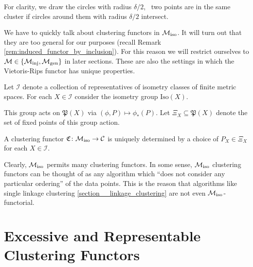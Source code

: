 \begin{example}{}{}
\begin{center}
\begin{minipage}{\textwidth}
\label{fig:vietoris_rips_example}
\end{minipage}
\end{center}
For clarity, we draw the circles with radius $\delta / 2$, \ie\ two points are in the same cluster if circles around them with radius $\delta / 2$ intersect.
\end{example}

We have to quickly talk about clustering functors in ${\mathcal{M}_\mathrm{iso}}$.
It will turn out that they are too general for our purposes (recall Remark \ref{rem:induced_functor_by_inclusion}).
For this reason we will restrict ourselves to $\mathcal{M} \in \{{\mathcal{M}_\mathrm{inj}}, {\mathcal{M}_\mathrm{gen}}\}$ in later sections. These are also the settings in which the Vietoris-Rips functor has unique properties.

\begin{myremark}{\cite[Thm.~6.1]{Carlsson2010}}{}
Let $\mathcal{I}$ denote a collection of representatives of isometry classes of finite metric spaces.
For each $X \in \mathcal{I}$ consider the isometry group $\mathrm{Iso}(X)$. \par

\medskip This group acts on $\mathfrak{P}(X)$ via $(\phi, P) \mapsto \phi_*(P)$.
Let $\Xi_X \subseteq \mathfrak{P}(X)$ denote the set of fixed points of this group action. \par

\medskip A clustering functor $\mathfrak{C}\colon {\mathcal{M}_\mathrm{iso}} \to \mathcal{C}$ is uniquely determined by a choice of $P_X \in \Xi_X$ for each $X \in \mathcal{I}$.
\end{myremark}

Clearly, ${\mathcal{M}_\mathrm{iso}}$ permits many clustering functors.
In some sense, ${\mathcal{M}_\mathrm{iso}}$ clustering functors can be thought of as any algorithm which ``does not consider any particular ordering'' of the data points.
This is the reason that algorithms like single linkage clustering \ref{section__linkage_clustering} are not even ${\mathcal{M}_\mathrm{iso}}$-functorial.

\section{Excessive and Representable Clustering Functors}

